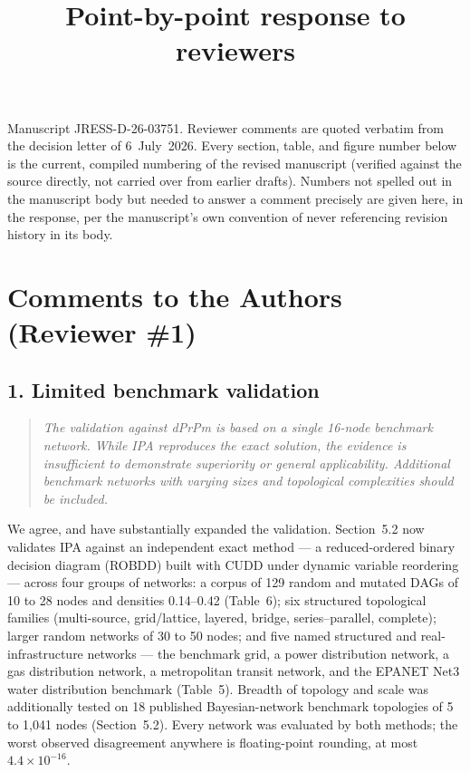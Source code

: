 \documentclass[11pt]{article}
\title{Point-by-point response to reviewers}
\author{}
\date{}
\newenvironment{revcomment}
  {\begin{quote}\itshape\color{gray!60!black}}
  {\end{quote}}
\begin{document}
\maketitle
\vspace{-2em}

\noindent Manuscript JRESS-D-26-03751. Reviewer comments are quoted verbatim from the decision letter of 6~July~2026. Every section, table, and figure number below is the current, compiled numbering of the revised manuscript (verified against the source directly, not carried over from earlier drafts). Numbers not spelled out in the manuscript body but needed to answer a comment precisely are given here, in the response, per the manuscript's own convention of never referencing revision history in its body.

\section*{Comments to the Authors (Reviewer \#1)}

\subsection*{1. Limited benchmark validation}
\begin{revcomment}
The validation against dPrPm is based on a single 16-node benchmark network. While IPA reproduces the exact solution, the evidence is insufficient to demonstrate superiority or general applicability. Additional benchmark networks with varying sizes and topological complexities should be included.
\end{revcomment}

We agree, and have substantially expanded the validation. Section~5.2 now validates IPA against an independent exact method --- a reduced-ordered binary decision diagram (ROBDD) built with CUDD under dynamic variable reordering --- across four groups of networks: a corpus of 129 random and mutated DAGs of 10 to 28 nodes and densities 0.14--0.42 (Table~6); six structured topological families (multi-source, grid/lattice, layered, bridge, series--parallel, complete); larger random networks of 30 to 50 nodes; and five named structured and real-infrastructure networks --- the benchmark grid, a power distribution network, a gas distribution network, a metropolitan transit network, and the EPANET Net3 water distribution benchmark (Table~5). Breadth of topology and scale was additionally tested on 18 published Bayesian-network benchmark topologies of 5 to 1{,}041 nodes (Section~5.2). Every network was evaluated by both methods; the worst observed disagreement anywhere is floating-point rounding, at most $4.4\times10^{-16}$.
\end{document}

